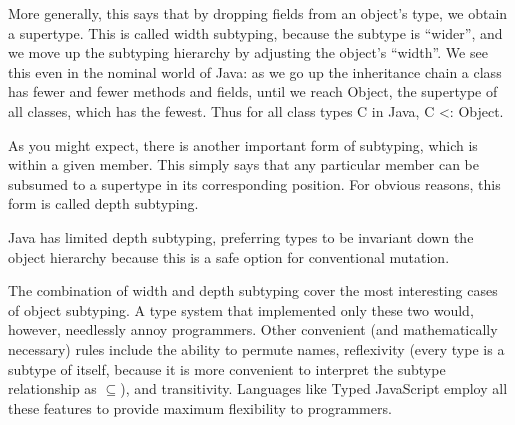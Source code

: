 More generally, this says that by dropping fields from an object’s type, we
obtain a supertype. This is called width subtyping, because the subtype is
“wider”, and we move up the subtyping hierarchy by adjusting the object’s
“width”. We see this even in the nominal world of Java: as we go up the
inheritance chain a class has fewer and fewer methods and fields, until we reach
Object, the supertype of all classes, which has the fewest. Thus for all class
types C in Java, C <: Object.

As you might expect, there is another important form of subtyping, which is
within a given member. This simply says that any particular member can be
subsumed to a supertype in its corresponding position. For obvious reasons, this
form is called depth subtyping.


Java has limited depth subtyping, preferring types to be invariant down the
object hierarchy because this is a safe option for conventional mutation.

The combination of width and depth subtyping cover the most interesting cases of
object subtyping. A type system that implemented only these two would, however,
needlessly annoy programmers. Other convenient (and mathematically necessary)
rules include the ability to permute names, reflexivity (every type is a subtype
of itself, because it is more convenient to interpret the subtype relationship
as $\subseteq$), and transitivity. Languages like Typed JavaScript employ all
these features to provide maximum flexibility to programmers.
